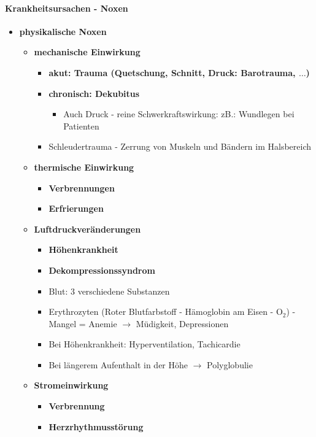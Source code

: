 \paragraph{Krankheitsursachen - Noxen}
	\begin{itemize}
		\item \textbf{physikalische Noxen}
			\begin{itemize}
				\item \textbf{mechanische Einwirkung}
					\begin{itemize}
						\item \textbf{akut: Trauma (Quetschung, Schnitt, Druck: Barotrauma, $\dots$)}
						\item \textbf{chronisch: Dekubitus}
							\begin{itemize}
								\item Auch Druck - reine Schwerkraftswirkung: zB.: Wundlegen bei Patienten
							\end{itemize}
						\item Schleudertrauma - Zerrung von Muskeln und Bändern im Halsbereich
					\end{itemize}
				\item \textbf{thermische Einwirkung}
					\begin{itemize}
						\item \textbf{Verbrennungen}
						\item \textbf{Erfrierungen}
					\end{itemize}
				\item \textbf{Luftdruckveränderungen}
					\begin{itemize}
						\item \textbf{Höhenkrankheit}
						\item \textbf{Dekompressionssyndrom}
						\item Blut: 3 verschiedene Substanzen
						\item Erythrozyten (Roter Blutfarbstoff - Hämoglobin am Eisen - O$_2$) - Mangel = Anemie $\rightarrow$ Müdigkeit, Depressionen
						\item Bei Höhenkrankheit: Hyperventilation, Tachicardie
						\item Bei längerem Aufenthalt in der Höhe $\rightarrow$ Polyglobulie
					\end{itemize}
				\item \textbf{Stromeinwirkung}
					\begin{itemize}
						\item \textbf{Verbrennung}
						\item \textbf{Herzrhythmusstörung}

\end{itemize}
\end{itemize}
\end{itemize}
